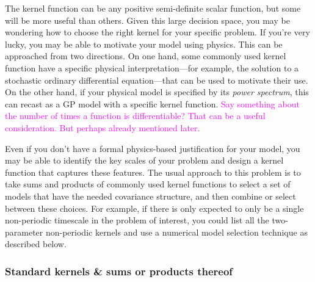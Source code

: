 \documentclass[letterpaper]{ar-1col}
\newcommand{\suz}[1]{\textcolor{magenta}{#1}}
\newcommand{\hyperparams}{\ensuremath{\boldsymbol{\phi}}}
\begin{document}
The kernel function can be any positive semi-definite scalar function, but some will be more useful than others.
Given this large decision space, you may be wondering how to choose the right kernel for your specific problem.
If you're very lucky, you may be able to motivate your model using physics.
This can be approached from two directions.
On one hand, some commonly used kernel function have a specific physical interpretation---for example, the solution to a stochastic ordinary differential equation---that can be used to motivate their use.
On the other hand, if your physical model is specified by its \emph{power spectrum}, this can recast as a GP model with a specific kernel function. \suz{Say something about the number of times a function is differentiable? That can be a useful consideration. But perhaps already mentioned later.}

Even if you don't have a formal physics-based justification for your model, you may be able to identify the key scales of your problem and design a kernel function that captures these features.
The usual approach to this problem is to take sums and products of commonly used kernel functions to select a set of  models that have the needed covariance structure, and then combine or select between these choices.
For example, if there is only expected to only be a single non-periodic timescale in the problem of interest, you could list all the two-parameter non-periodic kernels and use a numerical model selection technique as described below.

\subsubsection{Standard kernels \& sums or products thereof}
\end{document}
